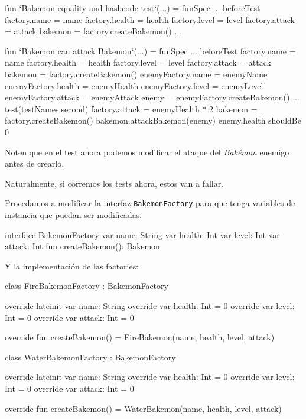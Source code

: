   \begin{kotlin}
    fun `Bakemon equality and hashcode test`(...) = funSpec {
      ...
      beforeTest {
        factory.name = name
        factory.health = health
        factory.level = level
        factory.attack = attack
        bakemon = factory.createBakemon()
      }
      ...
    }

    fun `Bakemon can attack Bakemon`(...) = funSpec {
      ...
      beforeTest {
        factory.name = name
        factory.health = health
        factory.level = level
        factory.attack = attack
        bakemon = factory.createBakemon()
        enemyFactory.name = enemyName
        enemyFactory.health = enemyHealth
        enemyFactory.level = enemyLevel
        enemyFactory.attack = enemyAttack
        enemy = enemyFactory.createBakemon()
      }
      ...
      test(testNames.second) {
        factory.attack = enemyHealth * 2
        bakemon = factory.createBakemon()
        bakemon.attackBakemon(enemy)
        enemy.health shouldBe 0
      }
    }
  \end{kotlin}

  Noten que en el test ahora podemos modificar el ataque del \textit{Bakémon} enemigo antes de
  crearlo.

  Naturalmente, si corremos los tests ahora, estos van a fallar.
  
  Procedamos a modificar la interfaz \texttt{BakemonFactory} para que tenga variables
  de instancia que puedan ser modificadas.

  \begin{kotlin}
    interface BakemonFactory {
      var name: String
      var health: Int
      var level: Int
      var attack: Int
      fun createBakemon(): Bakemon
    }
  \end{kotlin}

  Y la implementación de las factories:

  \begin{kotlin}
    class FireBakemonFactory : BakemonFactory {
      override lateinit var name: String
      override var health: Int = 0
      override var level: Int = 0
      override var attack: Int = 0

      override fun createBakemon() = FireBakemon(name, health, level, attack)
    }
  \end{kotlin}

  \begin{kotlin}
    class WaterBakemonFactory : BakemonFactory {
      override lateinit var name: String
      override var health: Int = 0
      override var level: Int = 0
      override var attack: Int = 0

      override fun createBakemon() = WaterBakemon(name, health, level, attack)
    }
  \end{kotlin}

